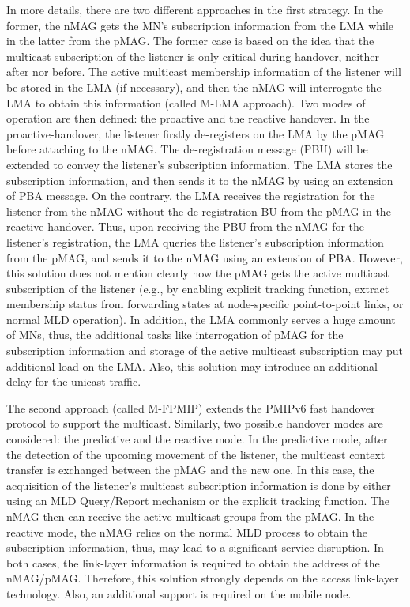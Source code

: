 In more details, there are two different approaches in the first strategy. In the former, the nMAG gets the MN's subscription information from the LMA \cite{SIAL} while in the latter from the pMAG. The former case \cite{SIAL} is based on the idea that the multicast subscription of the listener is only critical during handover, neither after nor before. The active multicast membership information of the listener will be stored in the LMA (if necessary), and then the nMAG will interrogate the LMA to obtain this information (called M-LMA approach). Two modes of operation are then defined: the proactive and the reactive handover. In the proactive-handover, the listener firstly de-registers on the LMA by the pMAG before attaching to the nMAG. The de-registration message (PBU) will be extended to convey the listener's subscription information. The LMA stores the subscription information, and then sends it to the nMAG by using an extension of PBA message. On the contrary, the LMA receives the registration for the listener from the nMAG without the de-registration BU from the pMAG in the reactive-handover. Thus, upon receiving the PBU from the nMAG for the listener's registration, the LMA queries the listener's subscription information from the pMAG, and sends it to the nMAG using an extension of PBA. However, this solution does not mention clearly how the pMAG gets the active multicast subscription of the listener (e.g., by enabling explicit tracking function, extract membership status from forwarding states at node-specific point-to-point links, or normal MLD operation). In addition, the LMA commonly serves a huge amount of MNs, thus, the additional tasks like interrogation of pMAG for the subscription information and storage of the active multicast subscription may put additional load on the LMA. Also, this solution may introduce an additional delay for the unicast traffic. 

The second approach (called M-FPMIP) \cite{FPMIPv6_multicast} extends the PMIPv6 fast handover protocol \cite{FPMIPv6} to support the multicast. Similarly, two possible handover modes are considered: the predictive and the reactive mode. In the predictive mode, after the detection of the upcoming movement of the listener, the multicast context transfer is exchanged between the pMAG and the new one. In this case, the acquisition of the listener's multicast subscription information is done by either using an MLD Query/Report mechanism or the explicit tracking function. The nMAG then can receive the active multicast groups from the pMAG. In the reactive mode, the nMAG relies on the normal MLD process to obtain the subscription information, thus, may lead to a significant service disruption. In both cases, the link-layer information is required to obtain the address of the nMAG/pMAG. Therefore, this solution strongly depends on the access link-layer technology. Also, an additional support is required on the mobile node. 

